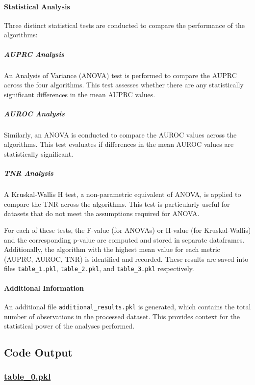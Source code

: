 \documentclass[11pt]{article}
\begin{document}
\paragraph{Statistical Analysis}
Three distinct statistical tests are conducted to compare the performance of the algorithms:

\subparagraph{AUPRC Analysis}
An Analysis of Variance (ANOVA) test is performed to compare the AUPRC across the four algorithms. This test assesses whether there are any statistically significant differences in the mean AUPRC values.

\subparagraph{AUROC Analysis}
Similarly, an ANOVA is conducted to compare the AUROC values across the algorithms. This test evaluates if differences in the mean AUROC values are statistically significant.

\subparagraph{TNR Analysis}
A Kruskal-Wallis H test, a non-parametric equivalent of ANOVA, is applied to compare the TNR across the algorithms. This test is particularly useful for datasets that do not meet the assumptions required for ANOVA.

For each of these tests, the F-value (for ANOVAs) or H-value (for Kruskal-Wallis) and the corresponding p-value are computed and stored in separate dataframes. Additionally, the algorithm with the highest mean value for each metric (AUPRC, AUROC, TNR) is identified and recorded. These results are saved into files \texttt{table\_1.pkl}, \texttt{table\_2.pkl}, and \texttt{table\_3.pkl} respectively.

\paragraph{Additional Information}
An additional file \texttt{additional\_results.pkl} is generated, which contains the total number of observations in the processed dataset. This provides context for the statistical power of the analyses performed.

\subsection{Code Output}\hypertarget{file-table-0-pkl}{}

\subsubsection*{\hyperlink{code-Data Analysis-table-0-pkl}{table\_0.pkl}}
\end{document}

